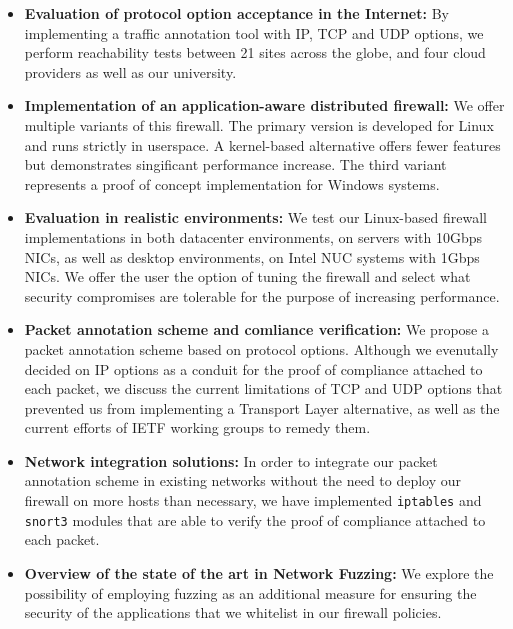\begin{itemize}
    \item \textbf{Evaluation of protocol option acceptance in the Internet:}
          By implementing a traffic annotation tool with IP, TCP and UDP options,
          we perform reachability tests between 21 sites across the globe, and
          four cloud providers as well as our university.
    \item \textbf{Implementation of an application-aware distributed firewall:}
          We offer multiple variants of this firewall. The primary version is
          developed for Linux and runs strictly in userspace. A kernel-based
          alternative offers fewer features but demonstrates singificant
          performance increase. The third variant represents a proof of concept
          implementation for Windows systems.
    \item \textbf{Evaluation in realistic environments:} We test our Linux-based
          firewall implementations in both datacenter environments, on servers
          with 10Gbps NICs, as well as desktop environments, on Intel NUC
          systems with 1Gbps NICs. We offer the user the option of tuning the
          firewall and select what security compromises are tolerable for the
          purpose of increasing performance.
    \item \textbf{Packet annotation scheme and comliance verification:} We
          propose a packet annotation scheme based on protocol options. Although
          we evenutally decided on IP options as a conduit for the proof of
          compliance attached to each packet, we discuss the current limitations
          of TCP and UDP options that prevented us from implementing a Transport
          Layer alternative, as well as the current efforts of IETF working
          groups to remedy them.
    \item \textbf{Network integration solutions:} In order to integrate our
          packet annotation scheme in existing networks without the need to
          deploy our firewall on more hosts than necessary, we have implemented
          \texttt{iptables} and \texttt{snort3} modules that are able to
          verify the proof of compliance attached to each packet.
    \item \textbf{Overview of the state of the art in Network Fuzzing:}
          We explore the possibility of employing fuzzing as an additional
          measure for ensuring the security of the applications that we
          whitelist in our firewall policies.
\end{itemize}

